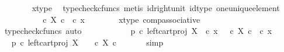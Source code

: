 \begin{isabellebody}
\ \ \ \ \ \ \isamarkupfalse%
\ x{\isacharunderscore}{\kern0pt}type\ \isamarkupfalse%
\ {\isacharparenleft}{\kern0pt}typecheck{\isacharunderscore}{\kern0pt}cfuncs{\isacharcomma}{\kern0pt}\ metis\ id{\isacharunderscore}{\kern0pt}right{\isacharunderscore}{\kern0pt}unit{}\ id{\isacharunderscore}{\kern0pt}type\ one{\isacharunderscore}{\kern0pt}unique{\isacharunderscore}{\kern0pt}element{\isacharparenright}{\kern0pt}\isanewline
\ \ \ \ \isamarkupfalse%
\ \isamarkupfalse%
\ {\isachardoublequoteopen}{\isachardot}{\kern0pt}{\isachardot}{\kern0pt}{\isachardot}{\kern0pt}\ {\isacharequal}{\kern0pt}\ {\isacharparenleft}{\kern0pt}{\isasymt}\ {\isasymcirc}\isactrlsub c\ {\isasymbeta}\isactrlbsub X\ {\isasymtimes}\isactrlsub c\ {\isasymone}\isactrlesub {\isacharparenright}{\kern0pt}\ {\isasymcirc}\isactrlsub c\ x{\isachardoublequoteclose}\isanewline
\ \ \ \ \ \ \isamarkupfalse%
\ x{\isacharunderscore}{\kern0pt}type\ comp{\isacharunderscore}{\kern0pt}associative{}\ \isamarkupfalse%
\ {\isacharparenleft}{\kern0pt}typecheck{\isacharunderscore}{\kern0pt}cfuncs{\isacharcomma}{\kern0pt}\ auto{\isacharparenright}{\kern0pt}\ \ \ \ \isanewline
\ \ \ \ \isamarkupfalse%
\ \isamarkupfalse%
\ {\isachardoublequoteopen}{\isacharparenleft}{\kern0pt}p\ {\isasymcirc}\isactrlsub c\ left{\isacharunderscore}{\kern0pt}cart{\isacharunderscore}{\kern0pt}proj\ X\ {\isasymone}{\isacharparenright}{\kern0pt}\ {\isasymcirc}\isactrlsub c\ x\ {\isacharequal}{\kern0pt}\ {\isacharparenleft}{\kern0pt}{\isasymt}\ {\isasymcirc}\isactrlsub c\ {\isasymbeta}\isactrlbsub X\ {\isasymtimes}\isactrlsub c\ {\isasymone}\isactrlesub {\isacharparenright}{\kern0pt}\ {\isasymcirc}\isactrlsub c\ x{\isachardoublequoteclose}\isacommand{{\isachardot}{\kern0pt}}\isamarkupfalse%
\isanewline
\ \ \isamarkupfalse%
\isanewline
\ \ \isamarkupfalse%
\ \isamarkupfalse%
\ {\isachardoublequoteopen}{\isacharparenleft}{\kern0pt}p\ {\isasymcirc}\isactrlsub c\ left{\isacharunderscore}{\kern0pt}cart{\isacharunderscore}{\kern0pt}proj\ X\ {\isasymone}{\isacharparenright}{\kern0pt}\isactrlsup {\isasymsharp}\ {\isacharequal}{\kern0pt}\ {\isacharparenleft}{\kern0pt}{\isasymt}\ {\isasymcirc}\isactrlsub c\ {\isasymbeta}\isactrlbsub X\ {\isasymtimes}\isactrlsub c\ {\isasymone}\isactrlesub {\isacharparenright}{\kern0pt}\isactrlsup {\isasymsharp}{\isachardoublequoteclose}\isanewline
\ \ \ \ \isamarkupfalse%
\ simp\isanewline

\end{isabellebody}
